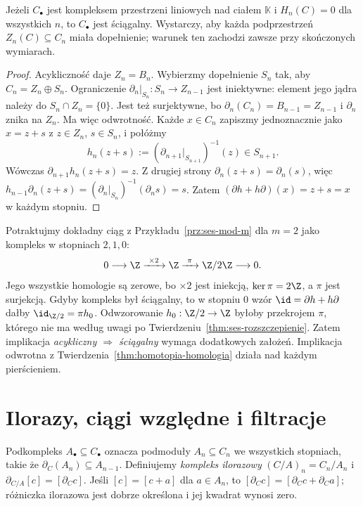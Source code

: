 \begin{stwierdzenie}
\label{prop:acykliczny-sciagalny}
Jeżeli $C_\bullet$ jest kompleksem
przestrzeni liniowych nad ciałem
$\mathbb K$ i $H_n(C)=0$ dla wszystkich
$n$, to $C_\bullet$ jest ściągalny.
Wystarczy, aby każda podprzestrzeń
$Z_n(C)\subseteq C_n$ miała dopełnienie;
warunek ten zachodzi zawsze przy
skończonych wymiarach.
\end{stwierdzenie}
\begin{proof}
Acykliczność daje $Z_n=B_n$.
Wybierzmy dopełnienie $S_n$ tak, aby
$C_n=Z_n\oplus S_n$. Ograniczenie
$\partial_n|_{S_n}:S_n\to Z_{n-1}$
jest iniektywne: element jego jądra
należy do $S_n\cap Z_n=\{0\}$.
Jest też surjektywne, bo
$\partial_n(C_n)=B_{n-1}=Z_{n-1}$
i $\partial_n$ znika na $Z_n$.
Ma więc odwrotność.
Każde $x\in C_n$ zapiszmy
jednoznacznie jako $x=z+s$
z $z\in Z_n$, $s\in S_n$, i połóżmy
\[
 h_n(z+s)
 :=(\partial_{n+1}|_{S_{n+1}})^{-1}(z)
 \in S_{n+1}.
\]
Wówczas $\partial_{n+1}h_n(z+s)=z$.
Z drugiej strony $\partial_n(z+s)=\partial_n(s)$,
więc
$h_{n-1}\partial_n(z+s)
=(\partial_n|_{S_n})^{-1}(\partial_ns)=s$.
Zatem $(\partial h+h\partial)(x)=z+s=x$
w każdym stopniu.
\end{proof}

\begin{przyklad}
\label{prz:acykliczny-niesciagalny}
Potraktujmy dokładny ciąg z
Przykładu~\ref{prz:ses-mod-m} dla $m=2$
jako kompleks w stopniach $2,1,0$:
\[
 0\longrightarrow\Z\xrightarrow{\ \times2\ }\Z
 \xrightarrow{\ \pi\ }\Z/2\Z\longrightarrow0.
\]
Jego wszystkie homologie są zerowe,
bo $\times2$ jest iniekcją,
$\ker\pi=2\Z$, a $\pi$ jest
surjekcją. Gdyby kompleks był
ściągalny, to w stopniu $0$
wzór $\id=\partial h+h\partial$ dałby
$\id_{\Z/2}=\pi h_0$.
Odwzorowanie $h_0:\Z/2\to\Z$ byłoby
przekrojem $\pi$, którego
nie ma według uwagi po
Twierdzeniu~\ref{thm:ses-rozszczepienie}.
Zatem implikacja \emph{acykliczny
$\Rightarrow$ ściągalny} wymaga
dodatkowych założeń. Implikacja
odwrotna z
Twierdzenia~\ref{thm:homotopia-homologia}
działa nad każdym pierścieniem.
\end{przyklad}

\section{Ilorazy, ciągi względne i filtracje}
\label{sec:iloraz-filtracja}

Podkompleks $A_\bullet\subseteq C_\bullet$
oznacza podmoduły $A_n\subseteq C_n$
we wszystkich stopniach, takie że
$\partial_C(A_n)\subseteq A_{n-1}$.
Definiujemy \emph{kompleks ilorazowy}
$(C/A)_n=C_n/A_n$ i
$\partial_{C/A}[c]=[\partial_Cc]$.
Jeśli $[c]=[c+a]$ dla $a\in A_n$,
to $[\partial_Cc]=[\partial_Cc+\partial_Ca]$;
różniczka ilorazowa jest dobrze
określona i jej kwadrat wynosi zero.

